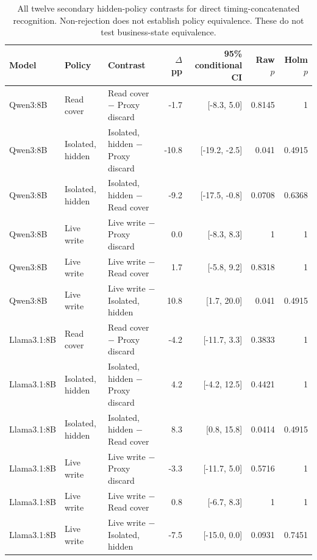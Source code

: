 \begin{table}[t]\centering\small
\caption{All twelve secondary hidden-policy contrasts for direct timing-concatenated recognition. Non-rejection does not establish policy equivalence. These do not test business-state equivalence.}\label{tab:b1-semantics}
\setlength{\tabcolsep}{4pt}
\begin{tabularx}{\textwidth}{@{}lP{.12\textwidth}Yrrrr@{}}\toprule
Model & Policy & Contrast & $\Delta$ pp & 95\% conditional CI & Raw $p$ & Holm $p$ \\\midrule
Qwen3:8B & Read cover & Read cover $-$ Proxy discard & -1.7 & [-8.3, 5.0] & 0.8145 & 1 \\
Qwen3:8B & Isolated, hidden & Isolated, hidden $-$ Proxy discard & -10.8 & [-19.2, -2.5] & 0.041 & 0.4915 \\
Qwen3:8B & Isolated, hidden & Isolated, hidden $-$ Read cover & -9.2 & [-17.5, -0.8] & 0.0708 & 0.6368 \\
Qwen3:8B & Live write & Live write $-$ Proxy discard & 0.0 & [-8.3, 8.3] & 1 & 1 \\
Qwen3:8B & Live write & Live write $-$ Read cover & 1.7 & [-5.8, 9.2] & 0.8318 & 1 \\
Qwen3:8B & Live write & Live write $-$ Isolated, hidden & 10.8 & [1.7, 20.0] & 0.041 & 0.4915 \\
Llama3.1:8B & Read cover & Read cover $-$ Proxy discard & -4.2 & [-11.7, 3.3] & 0.3833 & 1 \\
Llama3.1:8B & Isolated, hidden & Isolated, hidden $-$ Proxy discard & 4.2 & [-4.2, 12.5] & 0.4421 & 1 \\
Llama3.1:8B & Isolated, hidden & Isolated, hidden $-$ Read cover & 8.3 & [0.8, 15.8] & 0.0414 & 0.4915 \\
Llama3.1:8B & Live write & Live write $-$ Proxy discard & -3.3 & [-11.7, 5.0] & 0.5716 & 1 \\
Llama3.1:8B & Live write & Live write $-$ Read cover & 0.8 & [-6.7, 8.3] & 1 & 1 \\
Llama3.1:8B & Live write & Live write $-$ Isolated, hidden & -7.5 & [-15.0, 0.0] & 0.0931 & 0.7451 \\
\bottomrule\end{tabularx}\end{table}
